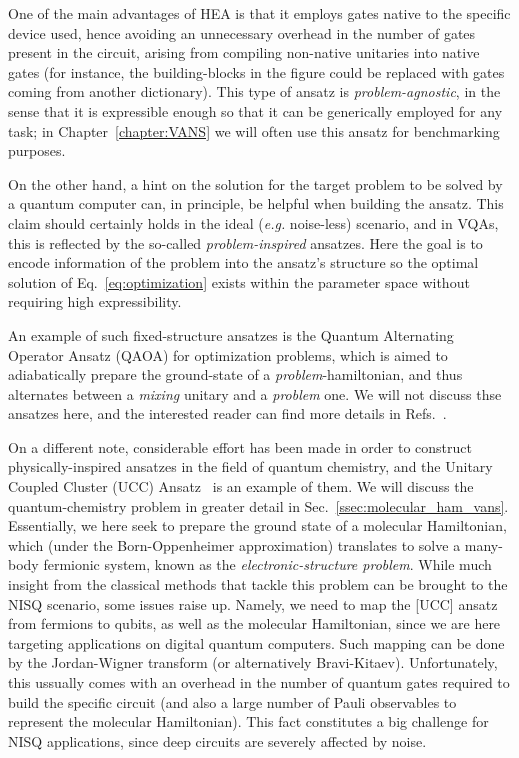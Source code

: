 One of the main advantages of HEA is that it employs gates native to the specific device used, hence avoiding an unnecessary overhead in the number of gates present in the circuit, arising from compiling non-native unitaries into native gates (for instance, the building-blocks in the figure could be replaced with gates coming from another dictionary). This type of ansatz is \textit{problem-agnostic}, in the sense that it is expressible enough so that it can be generically employed for any task; in Chapter~\ref{chapter:VANS} we will often use this ansatz for benchmarking purposes.

On the other hand, a hint on the solution for the target problem to be solved by a quantum computer can, in principle, be helpful when building the ansatz. This claim should certainly holds in the ideal (\textit{e.g.} noise-less) scenario, and in VQAs, this is reflected by the so-called \textit{problem-inspired} ansatzes. Here the goal is to encode information of the problem into the ansatz's structure so the optimal solution of Eq.~\eqref{eq:optimization} exists within the parameter space without requiring high expressibility.

An example of such fixed-structure ansatzes is the Quantum Alternating Operator Ansatz (QAOA) for optimization problems, which is aimed to adiabatically prepare the ground-state of a \textit{problem}-hamiltonian, and thus alternates between a \textit{mixing} unitary and a \textit{problem} one. We will not discuss thse ansatzes here, and the interested reader can find more details in Refs.~\cite{farhi2014quantum,hadfield2019quantum}.

On a different note, considerable effort has been made in order to construct physically-inspired ansatzes in the field of quantum chemistry, and the Unitary Coupled Cluster (UCC) Ansatz~\cite{cao2019quantum,bartlett2007coupled} is an example of them. We will discuss the quantum-chemistry problem in greater detail in Sec.~\ref{ssec:molecular_ham_vans}. Essentially, we here seek to prepare the ground state of a molecular Hamiltonian, which (under the Born-Oppenheimer approximation) translates to solve a many-body fermionic system, known as the \textit{electronic-structure problem}.
While much insight from the classical methods that tackle this problem can be brought to the NISQ scenario, some issues raise up. Namely, we need to map the [UCC] ansatz from fermions to qubits, as well as the molecular Hamiltonian, since we are here targeting applications on digital quantum computers. Such mapping can be done by the Jordan-Wigner transform (or alternatively Bravi-Kitaev). Unfortunately, this ussually comes with an overhead in the number of quantum gates required to build the specific circuit (and also a large number of Pauli observables to represent the molecular Hamiltonian). This fact constitutes a big challenge for NISQ applications, since deep circuits are severely affected by noise.


